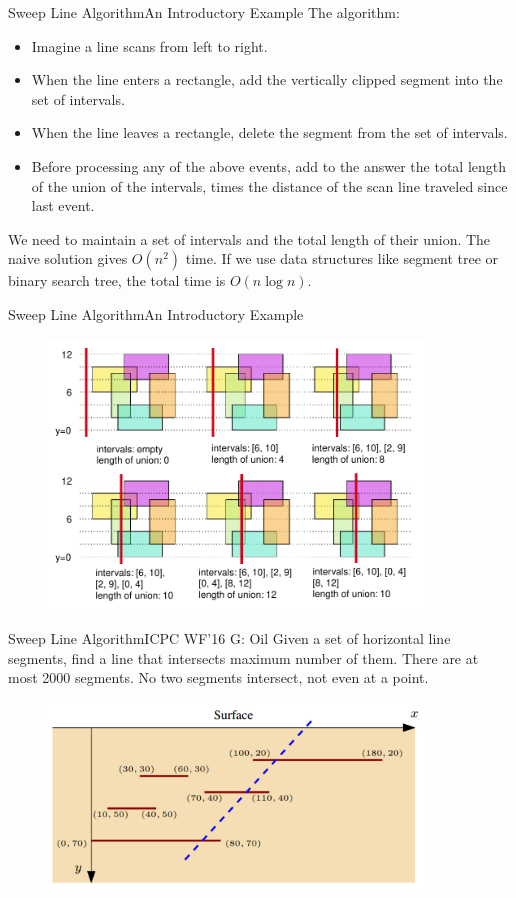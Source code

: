 \documentclass{beamer}
\begin{document}
\begin{frame}{Sweep Line Algorithm}{An Introductory Example}
The algorithm:
\begin{itemize}
	\item Imagine a line scans from left to right.
	\item When the line enters a rectangle, add the vertically clipped segment into the set of intervals.
	\item When the line leaves a rectangle, delete the segment from the set of intervals.
	\item Before processing any of the above events, add to the answer the total length of the union of the intervals, times the distance of the scan line traveled since last event.
\end{itemize}

\pause

We need to maintain a set of intervals and the total length of their union. The naive solution gives $O(n^2)$ time. If we use data structures like segment tree or binary search tree, the total time is $O(n \log n)$.
\end{frame}

\begin{frame}{Sweep Line Algorithm}{An Introductory Example}
\begin{figure}
\centering
\includegraphics[width=10cm]{sweep.pdf}
\end{figure}
\end{frame}

\begin{frame}{Sweep Line Algorithm}{ICPC WF'16 G: Oil}
Given a set of horizontal line segments, find a line that intersects maximum number of them. There are at most 2000 segments. No two segments intersect, not even at a point.
\begin{figure}
	\centering
	\includegraphics[width=10cm]{icpc16g.png}
\end{figure}
\end{frame}
\end{document}
